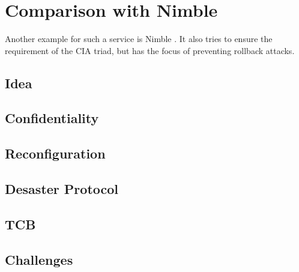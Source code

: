 \section{Comparison with Nimble}
Another example for such a service is Nimble \cite{Nimble}. It also tries to ensure the requirement of the CIA triad, but has the focus of preventing rollback attacks. 
\subsection{Idea}
\subsection{Confidentiality}
\subsection{Reconfiguration}
\subsection{Desaster Protocol}
\subsection{TCB}
\subsection{Challenges}